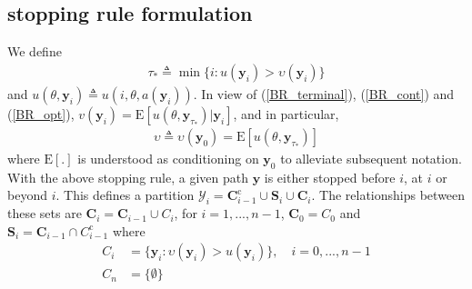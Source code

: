 \documentclass[11pt]{article}
\begin{document}
\subsection{stopping rule formulation}
We define
\begin{align}\label{tau_*}
\tau_*\triangleq\min\{i: u(\mathbf{y}_i)>\upsilon(\mathbf{y}_i)\}
\end{align}and $u(\theta,\mathbf{y}_i)\triangleq
u(i,\theta,a(\mathbf{y}_i))$. In view of (\ref{BR_terminal}),
(\ref{BR_cont}) and (\ref{BR_opt}),
$v(\mathbf{y}_i)=\mathrm{E}[u(\theta,\mathbf{y}_{\tau_*})|\mathbf{y}_i]$,
and in particular,
\begin{eqnarray}\label{opt_cont}
\upsilon\triangleq\upsilon(\mathbf{y}_0)=\mathrm{E}[u(\theta,\mathbf{y}_{\tau_*})]
\end{eqnarray}where $\mathrm{E}[.]$ is understood as conditioning on
$\mathbf{y}_0$ to alleviate subsequent notation. With the above
stopping rule, a given path $\mathbf{y}$ is either stopped before
$i$, at $i$ or beyond $i$. This defines a partition
$\boldsymbol{\mathcal{Y}}_i=\mathbf{C}_{i-1}^{\mathrm{c}}\cup\mathbf{S}_i
\cup \mathbf{C}_i$. The relationships between these sets are
$\mathbf{C}_i=\mathbf{C}_{i-1}\cup C_{i}$, for $i=1,...,n-1$,
$\mathbf{C}_0=C_{0}$ and $\mathbf{S}_i=\mathbf{C}_{i-1}\cap
C_{i-1}^{\mathrm{c}}$ where
\begin{align}\label{C_i} C_i &=\{\mathbf{y}_{i}:
\upsilon(\mathbf{y}_i)>u(\mathbf{y}_i)\}, \quad
i=0,...,n-1\\\label{C_0} C_{n}&=\{\emptyset\}
\end{align}
\end{document}

